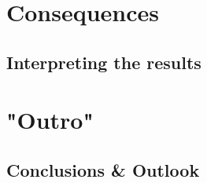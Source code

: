 \documentclass
[
    twoside,                 %
    openright,               %
    cleardoublepage = empty, %
    fontsize = 12 pt,        %
    british,                 %
    captions = tableheading, %
    numbers = noenddot,      %
    footheight = 35 pt,      %
]
{scrbook}
\begin{document}
\part{Consequences}

\chapter{Interpreting the results}


% 

\part{"Outro"}



\makeatletter
\def\toclevel@chapter{-1}
\def\toclevel@section{0}
\makeatother

\chapter{Conclusions \& Outlook}


\pagestyle{plain}

\renewcommand*{\bibfont}{\small}
\printbibheading
{}
\printbibliography[heading = none]


\end{document}
